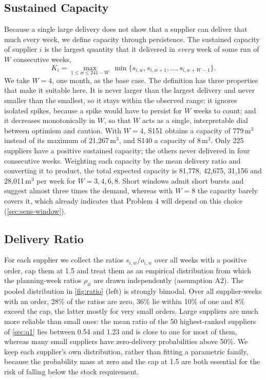 \documentclass[11pt,a4paper]{article}
\begin{document}
\subsection{Sustained Capacity}
Because a single large delivery does not show that a supplier can deliver that much every week, we define capacity through persistence.
The sustained capacity of supplier $i$ is the largest quantity that it delivered in \emph{every} week of some run of $W$ consecutive weeks,
\begin{equation}\label{eq:K}
K_i = \max_{1\le w\le 241-W}\ \min\{s_{i,w}, s_{i,w+1},\dots,s_{i,w+W-1}\}.
\end{equation}
We take $W=4$, one month, as the base case.
The definition has three properties that make it suitable here.
It is never larger than the largest delivery and never smaller than the smallest, so it stays within the observed range; it ignores isolated spikes, because a spike would have to persist for $W$ weeks to count; and it decreases monotonically in $W$, so that $W$ acts as a single, interpretable dial between optimism and caution.
With $W=4$, S151 obtains a capacity of 779\,m$^3$ instead of its maximum of 21{,}267\,m$^3$, and S140 a capacity of 8\,m$^3$.
Only 225 suppliers have a positive sustained capacity; the others never delivered in four consecutive weeks.
Weighting each capacity by the mean delivery ratio and converting it to product, the total expected capacity is 81{,}778, 42{,}675, 31{,}156 and 28{,}011\,m$^3$ per week for $W=3,4,6,8$.
Short windows admit short bursts and suggest almost three times the demand, whereas with $W=8$ the capacity barely covers it, which already indicates that Problem 4 will depend on this choice (\cref{sec:sens-window}).

\subsection{Delivery Ratio}
For each supplier we collect the ratios $s_{i,w}/o_{i,w}$ over all weeks with a positive order, cap them at 1.5 and treat them as an empirical distribution from which the planning-week ratios $\rho_{it}$ are drawn independently (assumption A2).
The pooled distribution in \cref{fig:ratio} (left) is strongly bimodal.
Over all supplier-weeks with an order, 28\% of the ratios are zero, 36\% lie within 10\% of one and 8\% exceed the cap, the latter mostly for very small orders.
Large suppliers are much more reliable than small ones: the mean ratio of the 50 highest-ranked suppliers of \cref{sec:q1} lies between 0.54 and 1.23 and is close to one for most of them, whereas many small suppliers have zero-delivery probabilities above 50\%.
We keep each supplier's own distribution, rather than fitting a parametric family, because the probability mass at zero and the cap at 1.5 are both essential for the risk of falling below the stock requirement.
\end{document}

